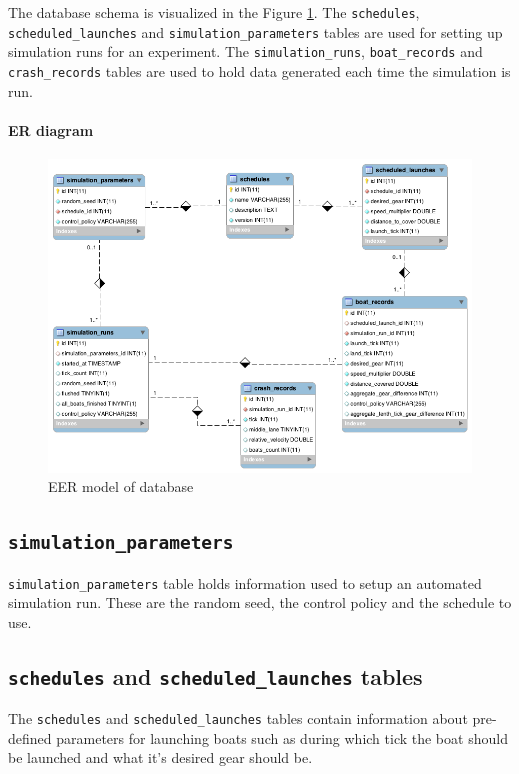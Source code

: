 The database schema is visualized in the Figure
\ref{software:fig:eer}. The \texttt{schedules}, \texttt{scheduled\_launches} and
\texttt{simulation\_parameters} tables are used for setting up simulation runs for an
experiment. The \texttt{simulation\_runs}, \texttt{boat\_records} and
\texttt{crash\_records} tables are used to hold data generated each
time the simulation is run.

\paragraph{ER diagram}

\begin{figure}
\begin{center}
  \includegraphics[scale=0.3]{images/eer.png}
  \caption{EER model of database}
  \label{software:fig:eer}
\end{center}
\end{figure}

\subsection{\texttt{simulation\_parameters}}
\texttt{simulation\_parameters} table holds information used to setup
an automated simulation run. These are the random seed, the control
policy and the schedule to use.

\subsection{\texttt{schedules} and \texttt{scheduled\_launches}
  tables}
The \texttt{schedules} and \texttt{scheduled\_launches} tables contain
information about pre-defined parameters for launching boats such as
during which tick the boat should be launched and what it's desired
gear should be.


